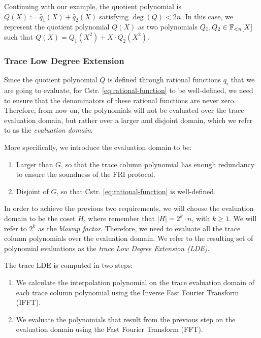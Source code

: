 Continuing with our example, the quotient polynomial is $Q(X) := \hat{q}_1(X) + \hat{q}_2(X)$ satisfying $\deg(Q) < 2n$. In this case, we represent the quotient polynomial $Q(X)$ as two polynomials $Q_1,Q_2 \in \mathbb{F}_{<n}[X]$ such that $Q(X) = Q_1(X^2) + X \cdot Q_2(X^2)$.


\subsubsection*{Trace Low Degree Extension} 

Since the quotient polynomial $Q$ is defined through rational functions $q_i$ that we are going to evaluate, for Cstr. \eqref{eq:rational-function} to be well-defined, we need to ensure that the denominators of these rational functions are never zero. Therefore, from now on, the polynomials will not be evaluated over the trace evaluation domain, but rather over a larger and disjoint domain, which we refer to as the \textit{evaluation domain}.

More specifically, we introduce the evaluation domain to be:
\begin{enumerate}
	\item Larger than $G$, so that the trace column polynomial has enough redundancy to ensure the soundness of the FRI protocol. 
	
	\item Disjoint of $G$, so that Cstr. \eqref{eq:rational-function} is well-defined.
\end{enumerate}

In order to achieve the previous two requirements, we will choose the evaluation domain to be the coset $H$, where remember that $|H| = 2^k \cdot n$, with $k \geq 1$. We will refer to $2^k$ as the \textit{blowup factor}. Therefore, we need to evaluate all the trace column polynomials over the evaluation domain. We refer to the resulting set of polynomial evaluations as the \textit{trace Low Degree Extension (LDE)}.

The trace LDE is computed in two steps:
\begin{enumerate}
	\item We calculate the interpolation polynomial on the trace evaluation domain of each trace column polynomial using the Inverse Fast Fourier Transform (IFFT). 
	\item We evaluate the polynomials that result from the previous step on the evaluation domain using the Fast Fourier Transform (FFT).
\end{enumerate}






